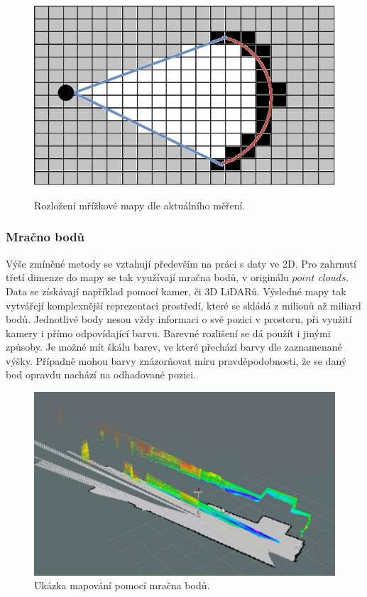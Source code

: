 \documentclass[12pt]{report}
\begin{document}
\begin{figure}[!ht]
	\begin{center}
		\includegraphics[width=0.7\columnwidth]{imgs/gridmap.png}
	\end{center}
	\caption{Rozložení mřížkové mapy dle aktuálního měření.}
	\label{fig:grid_map}
\end{figure}
\newpage
\subsubsection{Mračno bodů}
Výše zmíněné metody se vztahují především na práci s daty ve 2D. Pro zahrnutí třetí dimenze do mapy se tak využívají mračna bodů, v originálu $point$ $clouds$. Data se získávají například pomocí kamer, či 3D LiDARů. Výsledné mapy tak vytvářejí komplexnější reprezentaci prostředí, které se skládá z milionů až miliard bodů. Jednotlivé body nesou vždy informaci o své pozici v prostoru, při využití kamery i přímo odpovídající barvu. Barevné rozlišení se dá použít i jinými způsoby. Je možné mít škálu barev, ve které přechází barvy dle zaznamenané výšky. Případně mohou barvy znázorňovat míru pravděpodobnosti, že se daný bod opravdu nachází na odhadované pozici.

\begin{figure}[!ht]
	\begin{center}
		\includegraphics[width=0.6\columnwidth]{imgs/point_cloud.png}
	\end{center}
	\caption{Ukázka mapování pomocí mračna bodů.}
	\label{fig:point_cloud}
\end{figure}
\end{document}
